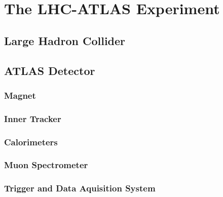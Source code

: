 \chapter{The LHC-ATLAS Experiment}
\section{Large Hadron Collider}
\section{ATLAS Detector}

\subsection{Magnet}
\subsection{Inner Tracker}
\subsection{Calorimeters}
\subsection{Muon Spectrometer}
\subsection{Trigger and Data Aquisition System}